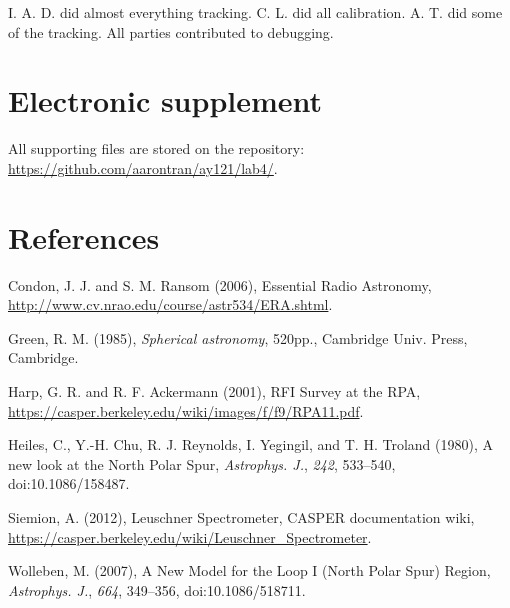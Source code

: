 \documentclass[10pt]{article}
\begin{document}
I. A. D. did almost everything tracking.  C. L. did all calibration.  A. T. did some of the tracking.  All parties contributed to debugging.

\section{Electronic supplement}

All supporting files are stored on the repository:\\
\href{https://github.com/aarontran/ay121}
{https://github.com/aarontran/ay121/lab4/}.

\section{References}

\hangindent 0.25in Condon, J. J. and S. M. Ransom (2006), Essential Radio Astronomy, \\
\href{http://www.cv.nrao.edu/course/astr534/ERA.shtml}
{http://www.cv.nrao.edu/course/astr534/ERA.shtml}.

\hangindent 0.25in Green, R. M. (1985), \textit{Spherical astronomy}, 520pp.,
Cambridge Univ. Press, Cambridge.

\hangindent 0.25in Harp, G. R. and R. F. Ackermann (2001), RFI Survey at the RPA, \\ \href{https://casper.berkeley.edu/wiki/images/f/f9/RPA11.pdf}{https://casper.berkeley.edu/wiki/images/f/f9/RPA11.pdf}.

\hangindent 0.25in Heiles, C., Y.-H. Chu, R. J. Reynolds, I. Yegingil, and T. H. Troland (1980), A new look at the North Polar Spur, \textit{Astrophys. J.}, \textit{242}, 533--540, doi:10.1086/158487.

\hangindent 0.25in Siemion, A. (2012), Leuschner Spectrometer, CASPER documentation wiki, \\
\href{https://casper.berkeley.edu/wiki/Leuschner\_Spectrometer}
{https://casper.berkeley.edu/wiki/Leuschner\_Spectrometer}.

\hangindent 0.25in Wolleben, M. (2007), A New Model for the Loop I (North Polar
Spur) Region, \textit{Astrophys. J.}, \textit{664}, 349--356,
doi:10.1086/518711.
\end{document}
